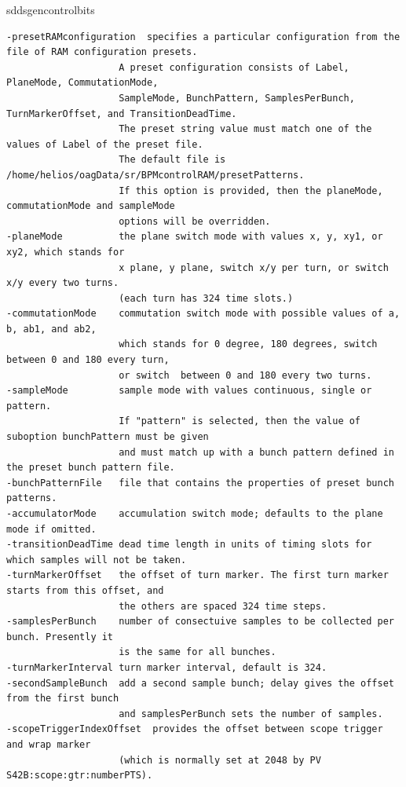 \begin{sddsprog}{sddsgencontrolbits}
\begin{verbatim}
-presetRAMconfiguration  specifies a particular configuration from the file of RAM configuration presets.
                    A preset configuration consists of Label, PlaneMode, CommutationMode,
                    SampleMode, BunchPattern, SamplesPerBunch, TurnMarkerOffset, and TransitionDeadTime.
                    The preset string value must match one of the values of Label of the preset file.
                    The default file is /home/helios/oagData/sr/BPMcontrolRAM/presetPatterns.
                    If this option is provided, then the planeMode, commutationMode and sampleMode
                    options will be overridden.
-planeMode          the plane switch mode with values x, y, xy1, or xy2, which stands for
                    x plane, y plane, switch x/y per turn, or switch x/y every two turns.
                    (each turn has 324 time slots.)
-commutationMode    commutation switch mode with possible values of a, b, ab1, and ab2,
                    which stands for 0 degree, 180 degrees, switch between 0 and 180 every turn,
                    or switch  between 0 and 180 every two turns.
-sampleMode         sample mode with values continuous, single or pattern.
                    If "pattern" is selected, then the value of suboption bunchPattern must be given
                    and must match up with a bunch pattern defined in the preset bunch pattern file.
-bunchPatternFile   file that contains the properties of preset bunch patterns.
-accumulatorMode    accumulation switch mode; defaults to the plane mode if omitted.
-transitionDeadTime dead time length in units of timing slots for which samples will not be taken.
-turnMarkerOffset   the offset of turn marker. The first turn marker starts from this offset, and
                    the others are spaced 324 time steps.
-samplesPerBunch    number of consectuive samples to be collected per bunch. Presently it
                    is the same for all bunches.
-turnMarkerInterval turn marker interval, default is 324.
-secondSampleBunch  add a second sample bunch; delay gives the offset from the first bunch
                    and samplesPerBunch sets the number of samples.
-scopeTriggerIndexOffset  provides the offset between scope trigger and wrap marker
                    (which is normally set at 2048 by PV S42B:scope:gtr:numberPTS).


\end{verbatim}
\end{sddsprog}
